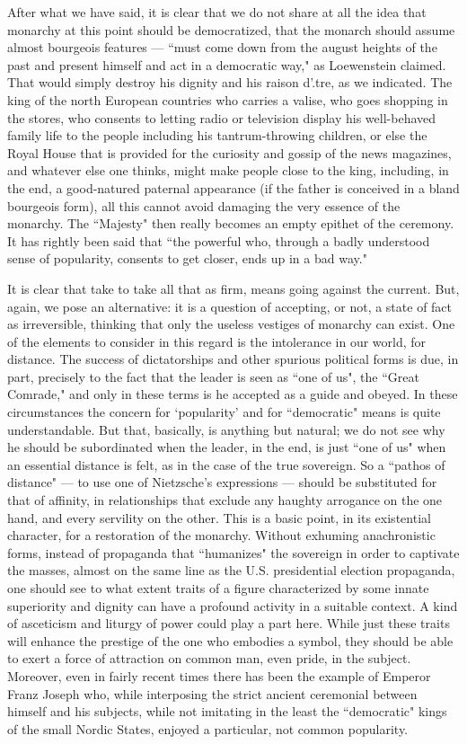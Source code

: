 After what we have said, it is clear that we do not share at all the idea that monarchy at this point should be democratized, that the monarch should assume almost bourgeois features — ``must come down from the august heights of the past and present himself and act in a democratic way," as Loewenstein claimed. That would simply destroy his dignity and his raison d'.tre, as we indicated. The king of the north European countries who carries a valise, who goes shopping in the stores, who consents to letting radio or television display his well-behaved family life to the people including his tantrum-throwing children, or else the Royal House that is provided for the curiosity and gossip of the news magazines, and whatever else one thinks, might make people close to the king, including, in the end, a good-natured paternal appearance (if the father is conceived in a bland bourgeois form), all this cannot avoid damaging the very essence of the monarchy. The ``Majesty" then really becomes an empty epithet of the ceremony. It has rightly been said that ``the powerful who, through a badly understood sense of popularity, consents to get closer, ends up in a bad way."

It is clear that take to take all that as firm, means going against the current. But, again, we pose an alternative: it is a question of accepting, or not, a state of fact as irreversible, thinking that only the useless vestiges of monarchy can exist. One of the elements to consider in this regard is the intolerance in our world, for distance. The success of dictatorships and other spurious political forms is due, in part, precisely to the fact that the leader is seen as ``one of us", the ``Great Comrade," and only in these terms is he accepted as a guide and obeyed. In these circumstances the concern for `popularity' and for ``democratic" means is quite understandable. But that, basically, is anything but natural; we do not see why he should be subordinated when the leader, in the end, is just ``one of us" when an essential distance is felt, as in the case of the true sovereign. So a ``pathos of distance" — to use one of Nietzsche's expressions — should be substituted for that of affinity, in relationships that exclude any haughty arrogance on the one hand, and every servility on the other. This is a basic point, in its existential character, for a restoration of the monarchy. Without exhuming anachronistic forms, instead of propaganda that ``humanizes" the sovereign in order to captivate the masses, almost on the same line as the U.S. presidential election propaganda, one should see to what extent traits of a figure characterized by some innate superiority and dignity can have a profound activity in a suitable context. A kind of asceticism and liturgy of power could play a part here. While just these traits will enhance the prestige of the one who embodies a symbol, they should be able to exert a force of attraction on common man, even pride, in the subject. Moreover, even in fairly recent times there has been the example of Emperor Franz Joseph who, while interposing the strict ancient ceremonial between himself and his subjects, while not imitating in the least the ``democratic" kings of the small Nordic States, enjoyed a particular, not common popularity.

